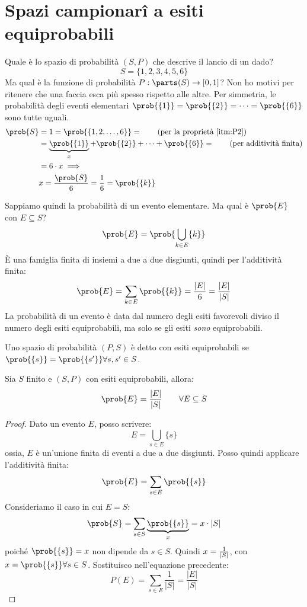 \section{Spazi campionar\^i  a esiti equiprobabili}

Quale \`e lo spazio di probabilit\`a $(S,P)$ che descrive il lancio di un dado?
\[
S = \{ 1, 2, 3, 4, 5, 6 \}
\]
Ma qual \`e la funzione di probabilit\`a $P : \parts(S) \to [0,1]$? Non ho motivi per ritenere che una faccia esca pi\`u spesso rispetto alle altre. Per simmetria, le probabilit\`a degli eventi elementari $\prob{\{1\}} = \prob{\{2\}} = \dots = \prob{\{6\}}$ sono tutte uguali.
\begin{align*}
\prob{S} &= 1 = \prob{\{1,2,\dots, 6\}} = \tag{per la propriet\`a \ref{itm:P2}} \\
&= \underbrace{\prob{\{1\}}}_{x} + \prob{\{2\}} + \dots + \prob{\{6\}} = \tag{per additivit\`a finita} \\
&= 6 \cdot x \implies \\
& x = \frac{\prob{S}}{6} = \frac{1}{6} = \prob{\{k\}}
\end{align*}

Sappiamo quindi la probabilit\`a di un evento elementare. Ma qual \`e $\prob{E}$ con $E \subseteq S$?
\[
\prob{E} = \prob{\bigcup_{k \in E} \{k\}}
\]
\`E una famiglia finita di insiemi a due a due disgiunti, quindi per l'additivit\`a finita:
\[
\prob{E} = \sum_{k \in E} \prob{\{k\}} = \frac{\abs{E}}{6} = \frac{\abs{E}}{\abs{S}}
\]
La probabilit\`a di un evento \`e data dal numero degli esiti favorevoli diviso il numero degli esiti equiprobabili, ma solo se gli esiti \emph{sono} equiprobabili.

\begin{defn}
Uno spazio di probabilit\`a $(P,S)$ \`e detto con esiti equiprobabili se $\prob{\{s\}} = \prob{\{s'\}} \forall s, s' \in S$.
\end{defn}
\begin{prop}
Sia $S$ finito e $(S,P)$ con esiti equiprobabili, allora:
\[
\prob{E} = \frac{\abs{E}}{\abs{S}} \qquad \forall  E \subseteq S
\]
\end{prop}
\begin{proof}
Dato un evento $E$, posso scrivere:
\[
E = \bigcup_{s \in E} \{ s \}
\]
ossia, $E$ \`e un'unione finita di eventi a due a due disgiunti. Posso quindi applicare l'additivit\`a finita:
\[
\prob{E} = \sum_{s \in E} \prob{\{s\}}
\]
Consideriamo il caso in cui $E = S$:
\[
\prob{S} = \sum_{s \in S} \underbrace{\prob{\{ s \}}}_{x} = x \cdot \abs{S}
\]
poich\'e $\prob{\{s\}} = x$ non dipende da $s \in S$. Quindi $x = \frac{1}{\left\lvert{S}\right\rvert}$, con $x = \prob{\{s\}} \forall  s \in S$. Sostituisco nell'equazione precedente:
\[
P(E) = \sum_{s \in E} \frac{1}{|S|} = \frac{|E|}{|S|}
\]
\end{proof}

